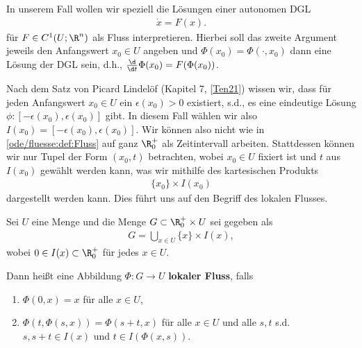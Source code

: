 \documentclass[letterpaper,10pt,english]{jupyterBook}
\begin{document}
In unserem Fall wollen wir speziell die Lösungen einer autonomen DGL
\begin{align*}
\dot{x} = F(x).
\end{align*}
für \(F\in C^1(U;\R^n)\) als Fluss interpretieren. Hierbei soll das zweite Argument jeweils den Anfangswert
\(x_0\in U\) angeben und \(\Phi(x_0) = \Phi(\cdot, x_0)\) dann eine Lösung der DGL sein, d.h., \(\frac{\d}{\d t} \Phi(x_0) = F(\Phi(x_0))\).

Nach dem Satz von Picard Lindelöf (Kapitel 7, {[}\hyperlink{cite.references:id7}{Ten21}{]}) wissen wir, dass für jeden Anfangswert \(x_0\in U\) ein \(\epsilon(x_0) >0\) existiert, s.d., es eine eindeutige Lösung \(\phi: [-\epsilon(x_0), \epsilon(x_0)]\) gibt. In diesem Fall wählen wir also \(I(x_0)=[-\epsilon(x_0), \epsilon(x_0)]\). Wir können also nicht wie in \cref{ode/fluesse:def:Fluss}  auf ganz \(\R^+_0\) als Zeitintervall arbeiten. Stattdessen können wir nur Tupel der Form \((x_0, t)\) betrachten, wobei \(x_0\in U\) fixiert ist und \(t\) aus \(I(x_0)\) gewählt werden kann, was wir mithilfe des kartesischen Produkts
\begin{align*}
\{x_0\}\times I(x_0)
\end{align*}
dargestellt werden kann. Dies führt uns auf den Begriff des lokalen Flusses.
\label{ode/fluesse:def:LokFluss}
\begin{definition}{}{}



Sei \(U\) eine Menge und die Menge \(G\subset \R^+_0\times U\) sei gegeben als
\begin{align*}
G = \bigcup_{x\in U} \{x\}\times I(x),
\end{align*}
wobei \(0\in I(x)\subset \R^+_0\) für jedes \(x\in U\).

Dann heißt eine Abbildung \(\Phi: G\rightarrow U\) \textbf{lokaler Fluss}, falls
\begin{enumerate}

\item {} 
\(\Phi(0,x) = x\) für alle \(x\in U\),

\item {} 
\(\Phi(t, \Phi(s, x)) = \Phi(s+t, x)\) für alle \(x\in U\) und alle \(s,t\) s.d. \(s, s+t\in I(x)\) und \(t\in I(\Phi(x,s))\).

\end{enumerate}
\end{definition}
\end{document}
